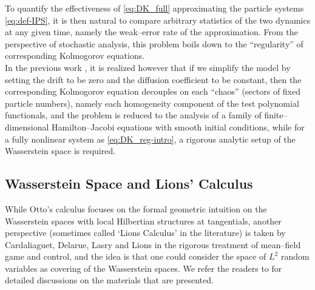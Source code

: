 To quantify the effectiveness of \eqref{eq:DK_full} approximating the particle systems \eqref{eq:def-IPS}, it is then natural to compare arbitrary statistics of the two dynamics at any given time, namely the weak--error rate of the approximation. From the perspective of stochastic analysis, this problem boils down to the ``regularity'' of corresponding Kolmogorov equations.\\

In the previous work \cite{DKP23}, it is realized however that if we simplify the model by setting the drift to be zero and the diffusion coefficient to be constant, then the corresponding Kolmogorov equation decouples on each ``chaos'' (sectors of fixed particle numbers), namely each homogeneity component of the test polynomial functionals, and the problem is reduced to the analysis of a family of finite--dimensional Hamilton--Jacobi equations with smooth initial conditions, while for a fully nonlinear system as \eqref{eq:DK_reg-intro}, a rigorous analytic setup of the Wasserstein space is required. 


\subsection{Wasserstein Space and Lions' Calculus}\label{sec:Wasserstein-Lions}

While Otto's calculus focuses on the formal geometric intuition on the Wasserstein spaces with local Hilbertian structures at tangentials, another perspective (sometimes called `Lions Calculus' in the literature) is taken by Cardaliaguet, Delarue, Lasry and Lions in the rigorous treatment of mean--field game and control, and the idea is that one could consider the space of $L^2$ random variables as covering of the Wasserstein spaces. We refer the readers to \cite{C10, BLPC17, CDLL19, CD22} for detailed discussions on the materials that are presented. \\

